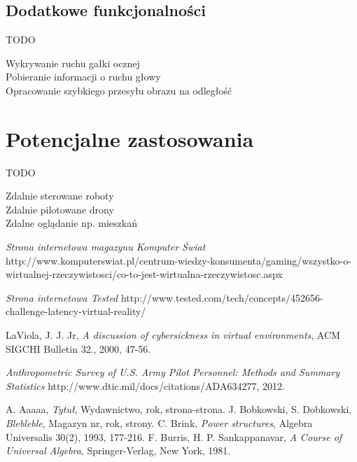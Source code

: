 \documentclass[a4paper,11pt,twoside]{report}
\theoremstyle{definition}
\begin{document}
\subsection{Dodatkowe funkcjonalności}
TODO
\begin{description}
\item [Wykrywanie ruchu gałki ocznej]
\item [Pobieranie informacji o ruchu głowy]
\item [Opracowanie szybkiego przesyłu obrazu na odległość]
\end{description}

\section{Potencjalne zastosowania}
TODO
\begin{description}
\item [Zdalnie sterowane roboty]
\item [Zdalnie pilotowane drony]
\item [Zdalne oglądanie np. mieszkań]
\end{description}


\begin{thebibliography}{20}%

 \emph{Strona internetowa magazynu Komputer Świat} http://www.komputerswiat.pl/centrum-wiedzy-konsumenta/gaming/wszystko-o-wirtualnej-rzeczywistosci/co-to-jest-wirtualna-rzeczywistosc.aspx

 \emph{Strona internetowa Tested} http://www.tested.com/tech/concepts/452656-challenge-latency-virtual-reality/

 LaViola, J. J. Jr, \emph{A discussion of cybersickness in virtual environments}, ACM SIGCHI Bulletin 32., 2000, 47-56.

 \emph{Anthropometric Survey of U.S. Army Pilot Personnel: Methods and Summary Statistics} http://www.dtic.mil/docs/citations/ADA634277, 2012.


 A. Aaaaa, \emph{Tytuł}, Wydawnictwo, rok, strona-strona.
 J. Bobkowski, S. Dobkowski, \emph{Blebleble}, Magazyn nr, rok, strony.
 C. Brink, \emph{Power structures}, Algebra Universalis 30(2), 1993, 177-216.
 F. Burris, H. P. Sankappanavar, \emph{A Course of Universal Algebra}, Springer-Verlag, New York, 1981.
\end{thebibliography}
\thispagestyle{empty}
\end{document}
